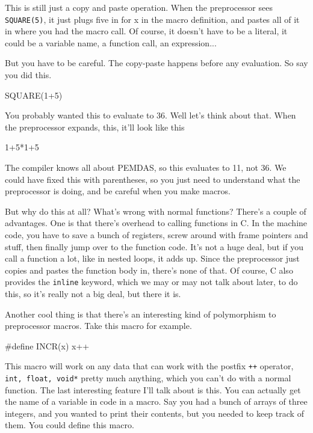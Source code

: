 \documentclass[ebook,11pt,oneside,openany]{memoir}
\newcommand{\cf}[1]{\texttt{#1}}
\begin{document}
This is still just a copy and paste operation. When the preprocessor sees \cf{SQUARE(5)}, it just plugs five in for x in the macro definition, and pastes all of it in where you had the macro call. Of course, it doesn't have to be a literal, it could be a variable name, a function call, an expression...

But you have to be careful. The copy-paste happens before any evaluation. So say you did this.

\begin{code}[language=C]
SQUARE(1+5)
\end{code}

You probably wanted this to evaluate to 36. Well let's think about that. When the preprocessor expands, this, it'll look like this

\begin{code}[language=C]
1+5*1+5
\end{code}

The compiler knows all about PEMDAS, so this evaluates to 11, not 36. We could have fixed this with parentheses, so you just need to understand what the preprocessor is doing, and be careful when you make macros.

But why do this at all? What's wrong with normal functions? There's a couple of advantages. One is that there's overhead to calling functions in C. In the machine code, you have to save a bunch of registers, screw around with frame pointers and stuff, then finally jump over to the function code. It's not a huge deal, but if you call a function a lot, like in nested loops, it adds up. Since the preprocessor just copies and pastes the function body in, there's none of that. Of course, C also provides the \cf{inline} keyword, which we may or may not talk about later, to do this, so it's really not a big deal, but there it is.

Another cool thing is that there's an interesting kind of polymorphism to preprocessor macros. Take this macro for example.

\begin{code}[language=C]
#define INCR(x) x++
\end{code}

This macro will work on any data that can work with the postfix \cf{++} operator, \cf{int, float, void*} pretty much anything, which you can't do with a normal function. The last interesting feature I'll talk about is this. You can actually get the name of a variable in code in a macro. Say you had a bunch of arrays of three integers, and you wanted to print their contents, but you needed to keep track of them. You could define this macro.
\end{document}
